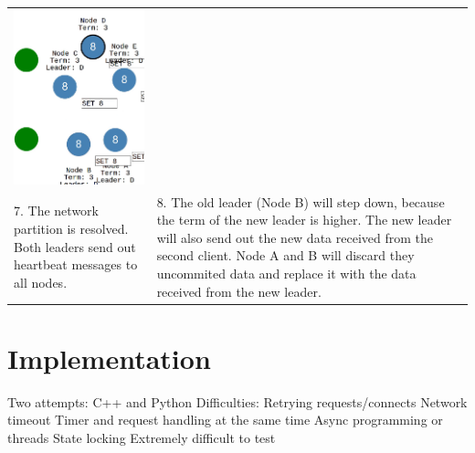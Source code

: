 \begin{tabularx}{\textwidth}{ |X|X| }
  \includegraphics[scale=0.28]{scenarios/network_partition/2200.png} \\
  7. The network partition is resolved. Both leaders send out heartbeat messages to all nodes. &
  8. The old leader (Node B) will step down, because the term of the new leader is higher. The new leader will also send out the new data received from the second client. Node A and B will discard they uncommited data and replace it with the data received from the new leader.\\
  \hline
\end{tabularx}


\section{Implementation}

Two attempts: C++ and Python
Difficulties:
Retrying requests/connects
Network timeout
Timer and request handling at the same time
Async programming or threads
State locking
Extremely difficult to test

